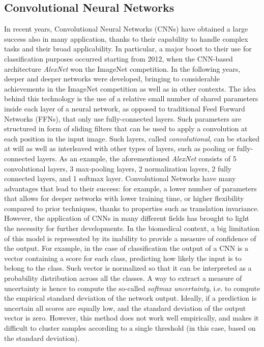 \documentclass[11pt,twoside,a4paper]{article}
\begin{document}
\subsection{Convolutional Neural Networks}
In recent years, Convolutional Neural Networks (CNNs) have obtained a large success also in many application, thanks to their capability to handle complex tasks and their broad applicability. In particular, a major boost to their use for classification purposes occurred starting from 2012, when the CNN-based architecture \textit{AlexNet} won the ImageNet competition. In the following years, deeper and deeper networks were developed, bringing to considerable achievements in the ImageNet competition as well as in other contexts.\newline
The idea behind this technology is the use of a relative small number of shared parameters inside each layer of a neural network, as opposed to traditional Feed Forward Networks (FFNs), that only use fully-connected layers. Such parameters are structured in form of sliding filters that can be used to apply a convolution at each position in the input image. Such layers, called \textit{convolutional}, can be stacked at will as well as interleaved with other types of layers, such as pooling or fully-connected layers. As an example, the aforementioned \textit{AlexNet} consists of 5 convolutional layers, 3 max-pooling layers, 2 normalization layers, 2 fully connected layers, and 1 softmax layer.\newline
Convolutional Networks have many advantages that lead to their success: for example, a lower number of parameters that allows for deeper networks with lower training time, or higher flexibility compared to prior techniques, thanks to properties such as translation invariance. However, the application of CNNs in many different fields has brought to light the necessity for further developments. In the biomedical context, a big limitation of this model is represented by its inability to provide a measure of confidence of the output.\newline
For example, in the case of classification the output of a CNN is a vector containing a score for each class, predicting how likely the input is to belong to the class. Such vector is normalized so that it can be interpreted as a probability distribution across all the classes. A way to extract a measure of uncertainty is hence to compute the so-called \textit{softmax uncertainty}, i.e. to compute the empirical standard deviation of the network output. Ideally, if a prediction is uncertain all scores are equally low, and the standard deviation of the output vector is zero. However, this method does not work well empirically, and makes it difficult to cluster samples according to a single threshold (in this case, based on the standard deviation).
\end{document}
